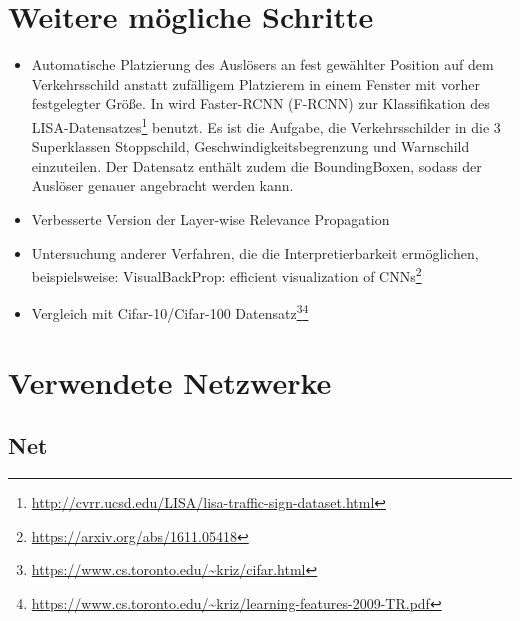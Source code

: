 \documentclass{article}
\theoremstyle{break}
\begin{document}
	\section{Weitere mögliche Schritte}
	\begin{itemize}
		\item Automatische Platzierung des Auslösers an fest gewählter Position auf dem Verkehrsschild anstatt zufälligem Platzierem in einem Fenster mit vorher festgelegter Größe. In \cite{badnets} wird  Faster-RCNN (F-RCNN) zur Klassifikation des LISA-Datensatzes\footnote{\url{http://cvrr.ucsd.edu/LISA/lisa-traffic-sign-dataset.html}} benutzt. Es ist die Aufgabe, die Verkehrsschilder in die 3 Superklassen Stoppschild, Geschwindigkeitsbegrenzung und Warnschild einzuteilen. Der Datensatz enthält zudem die BoundingBoxen, sodass der Auslöser genauer angebracht werden kann.
		\item Verbesserte Version der Layer-wise Relevance Propagation
		\item Untersuchung anderer Verfahren, die die Interpretierbarkeit ermöglichen, beispielsweise: VisualBackProp: efficient visualization of CNNs\footnote{\url{https://arxiv.org/abs/1611.05418}}
		\item Vergleich mit Cifar-10/Cifar-100 Datensatz\footnote{\url{https://www.cs.toronto.edu/~kriz/cifar.html}}\footnote{\url{https://www.cs.toronto.edu/~kriz/learning-features-2009-TR.pdf}}
	\end{itemize}
	
	\newpage
	\appendix
	\section{Verwendete Netzwerke}
	\subsection{Net}
	
\end{document}
